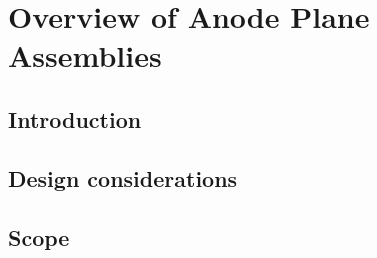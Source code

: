 \chapter{Overview of Anode Plane Assemblies}
\label{ch:fdsp-apa-ov}

\section{Introduction}
\label{sec:fdsp-apa-intro}


\section{Design considerations}
\label{sec:fdsp-apa-des-consid}


\section{Scope}
\label{sec:fdsp-apa-scope}

